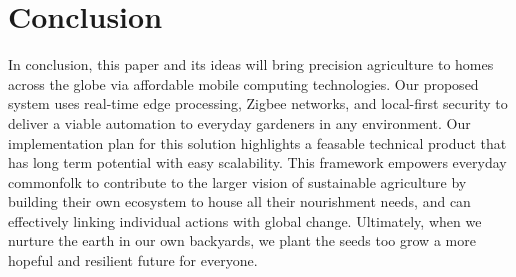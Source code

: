 \documentclass{sigchi}
\begin{document}
\section{Conclusion}

In conclusion, this paper and its ideas will bring precision agriculture to homes across the globe via affordable mobile computing technologies. Our proposed system uses real-time edge processing, Zigbee networks, and local-first security to deliver a viable automation to everyday gardeners in any environment. Our implementation plan for this solution highlights a feasable technical product that has long term potential with easy scalability. This framework empowers everyday commonfolk to contribute to the larger vision of sustainable agriculture by building their own ecosystem to house all their nourishment needs, and can effectively linking individual actions with global change. Ultimately, when we nurture the earth in our own backyards, we plant the seeds too grow a more hopeful and resilient future for everyone.

\balance{}




\end{document}
